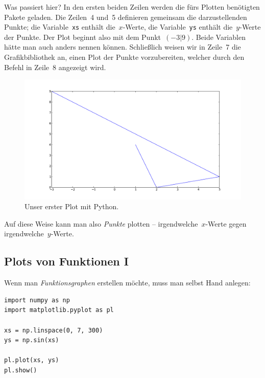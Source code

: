 \documentclass{blatt}
\begin{document}
  Was passiert hier? In den ersten beiden Zeilen werden die fürs Plotten
  benötigten Pakete geladen. Die Zeilen~4 und~5 definieren gemeinsam die
  darzustellenden Punkte; die Variable~\texttt{xs} enthält
  die~$x$-Werte, die Variable~\texttt{ys} enthält die~$y$-Werte der
  Punkte. Der Plot beginnt also mit dem Punkt~$(-3|9)$. Beide Variablen hätte man
  auch anders nennen können. Schließlich weisen wir in Zeile~7 die
  Grafikbibliothek an, einen Plot der Punkte vorzubereiten, welcher durch den
  Befehl in Zeile~8 angezeigt wird.

  \begin{figure}
  \centering
  \includegraphics[scale=0.4]{first-plot}
  \caption{\label{fig:first-plot}Unser erster Plot mit Python.}
  \end{figure}

  Auf diese Weise kann man also \emph{Punkte} plotten --
  irgendwelche~$x$-Werte gegen irgendwelche~$y$-Werte.


\subsection{Plots von Funktionen I}

Wenn man \emph{Funktionsgraphen} erstellen möchte, muss man selbst Hand anlegen:

\begin{verbatim}
import numpy as np
import matplotlib.pyplot as pl

xs = np.linspace(0, 7, 300)
ys = np.sin(xs)

pl.plot(xs, ys)
pl.show()
\end{verbatim}
\end{document}
